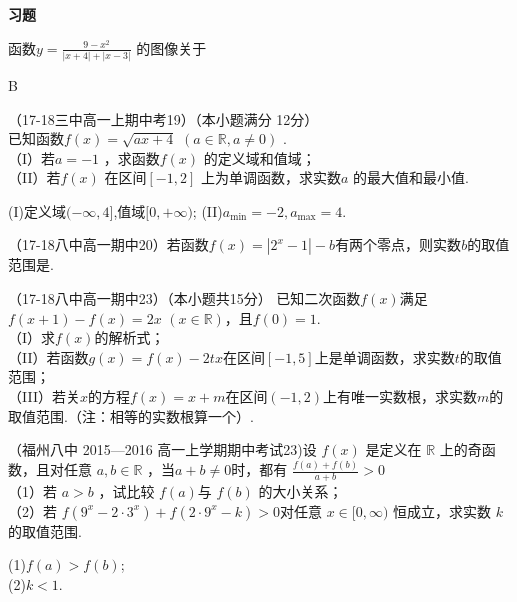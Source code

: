\begin{exercise}{\large \bf 习\hspace{0.6em}题}

\item
函数$y=\frac{9-x^2}{|x+4|+|x-3|}$ 的图像关于\xz
{}
\begin{answer}
B
\end{answer}


\item
（17-18三中高一上期中考19）（本小题满分 12分）\\
已知函数$f(x)=\sqrt{ax+4}$ $(a\in\mathbb{R},a\neq0)$  .\\
（I）若$a=-1$ ，求函数$f(x)$ 的定义域和值域；\\  
（II）若$f(x)$ 在区间$[-1,2] $ 上为单调函数，求实数$a$ 的最大值和最小值.\\
\begin{answer}
(I)定义域$(-\infty,4]$,值域$[0,+\infty)$;
(II)$a_{\min}=-2,a_{\max}=4 $.
\end{answer}
\vspace{12em}



\item
（17-18八中高一期中20）若函数$f(x)=|2^x-1|-b $有两个零点，则实数$b$的取值范围是\tk.\\
\item
（17-18八中高一期中23）（本小题共15分）
已知二次函数$f(x)$满足$f(x+1)-f(x)=2x $ $(x\in\mathbb{R})$，且$f(0)=1$.\\
（I）求$f(x)$的解析式；\\
（II）若函数$g(x)=f(x)-2tx$在区间$[-1,5]$上是单调函数，求实数$t$的取值范围；\\
（III）若关$x$的方程$f(x)=x+m $在区间$(-1,2)$上有唯一实数根，求实数$m$的取值范围.（注：相等的实数根算一个）.\\
\vspace{16em}



\item
（福州八中 2015—2016 高一上学期期中考试23)设 $f (x )$ 是定义在 $\mathbb{R}$ 上的奇函数，且对任意 $a,b\in \mathbb{R}$ ，当$a+b\neq0$时，都有 $\frac{f(a)+f(b)}{a+b}>0$\\
（1）若 $a> b$ ，试比较 $f (a ) $与 $f (b)$ 的大小关系；\\
（2）若 $f (9^x- 2\cdot 3^x )+ f ( 2\cdot 9^x-k )> 0 $对任意 $x\in[0,\infty )$ 恒成立，求实数 $k$ 的取值范围.
\begin{answer}
(1)$f(a)>f(b)$;\\
(2)$k<1$.\\
\end{answer}
\vspace{12em}

\end{exercise}
{\hspace{2em}}
{\hspace{2em}}
{\hspace{2em}}
{\hspace{2em}}


\stopexercise